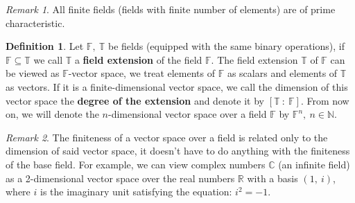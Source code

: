 \documentclass[thesis=M,english]{FITthesis}[2012/10/20]
\theoremstyle{remark}
\newtheorem*{RM}{Remark}
\theoremstyle{definition}
\newtheorem{DF}{Definition}[section]
\begin{document}
\begin{RM}
All finite fields (fields with finite number of elements) are of prime characteristic. 
\end{RM}

\begin{DF}
Let $\mathbb{F},\ \mathbb{T}$ be fields (equipped with the same binary operations), if $\mathbb{F} \subseteq \mathbb{T}$ we call $\mathbb{T}$ a \textbf{field extension} of the field $\mathbb{F}$. The field extension $\mathbb{T}$ of $\mathbb{F}$ can be viewed as $\mathbb{F}$-vector space, we treat elements of $\mathbb{F}$ as scalars and elements of $\mathbb{T}$ as vectors. If it is a finite-dimensional vector space, we call the dimension of this vector space the \textbf{degree of the extension} and denote it by $[\mathbb{T}\ :\ \mathbb{F}]$. From now on, we will denote the $n$-dimensional vector space over a field $\mathbb{F}$ by $\mathbb{F}^n,\ n \in \mathbb{N}$.
\end{DF}
\begin{RM}
The finiteness of a vector space over a field is related only to the dimension of said vector space, it doesn't have to do anything with the finiteness of the base field. For example, we can view complex numbers $\mathbb{C}$ (an infinite field) as a 2-dimensional vector space over the real numbers $\mathbb{R}$ with a basis $(1,\ \mathit{i})$, where $\mathit{i}$ is the imaginary unit satisfying the equation: $\mathit{i}^2 = -1.$
\end{RM}
\end{document}
